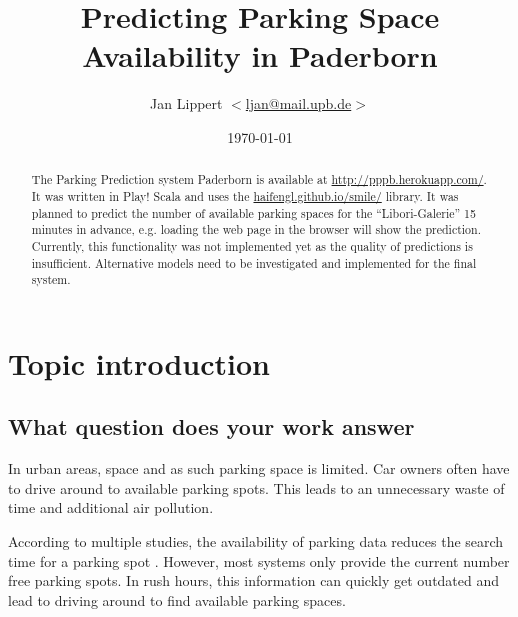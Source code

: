 \documentclass[journal,10pt]{IEEEtran}
\author{Jan Lippert \(<\)\href{mailto:ljan@mail.upb.de}{ljan@mail.upb.de}\(>\)}
\date{\today}
\begin{document}
\title{Predicting Parking Space Availability in Paderborn}
\maketitle

\begin{abstract}
The Parking Prediction system Paderborn is available at \url{http://pppb.herokuapp.com/}. It was written in Play! Scala and uses the \href{smile}{haifengl.github.io/smile/} library. It was planned to predict the number of available parking spaces for the ``Libori-Galerie'' 15 minutes in advance, e.g. loading the web page in the browser will show the prediction. Currently, this functionality was not implemented yet as the quality of predictions is insufficient. Alternative models need to be investigated and implemented for the final system. 
\end{abstract}

\section{Topic introduction}

\subsection{What question does your work answer}
In urban areas, space and as such parking space is limited. Car owners often have to drive around to available parking spots. This leads to an unnecessary waste of time and additional air pollution. 

According to multiple studies, the availability of parking data reduces the search time for a parking spot \cite{Asakura1994}\cite{Caicedo2010228}. However, most systems only provide the current number free parking spots. In rush hours, this information can quickly get outdated and lead to driving around to find available parking spaces.

\end{document}
